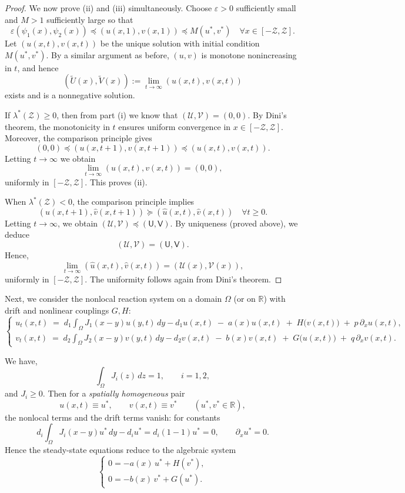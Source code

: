 \documentclass[a4paper,11pt]{amsart}
\theoremstyle{definition}
\numberwithin{equation}{section}
\theoremstyle{definition}
\begin{document}
\begin{proof}
\medskip

We now prove (ii) and (iii) simultaneously. Choose $\varepsilon > 0$ sufficiently small
and $M > 1$ sufficiently large so that
\[
\varepsilon (\psi_1(x), \psi_2(x)) \preceq (u(x,1), v(x,1)) \preceq M (u^{\ast}, v^{\ast})
\quad \forall x \in [-\mathcal{Z}, \mathcal{Z}].
\]
Let $(u(x,t), v(x,t))$ be the unique solution with initial condition $M(u^{\ast}, v^{\ast})$.
By a similar argument as before, $(u,v)$ is monotone nonincreasing in $t$, and hence
\[
(\widetilde{U}(x), \widetilde{V}(x)) := \lim_{t \to \infty} (u(x,t), v(x,t))
\]
exists and is a nonnegative solution.

If $\lambda^\ast(\mathcal{Z}) \geq 0$, then from part (i) we know that
$(\mathscr{U}, \mathscr{V}) = (0,0)$. By Dini’s theorem, the monotonicity in $t$ ensures uniform convergence in $x \in [-\mathcal{Z}, \mathcal{Z}]$. Moreover, the comparison principle gives
\[
(0,0) \preceq (u(x,t+1), v(x,t+1)) \preceq (u(x,t), v(x,t)).
\]
Letting $t \to \infty$ we obtain
\[
\lim_{t \to \infty} (u(x,t), v(x,t)) = (0,0),
\]
uniformly in $[-\mathcal{Z}, \mathcal{Z}]$. This proves (ii).

When $\lambda^\ast(\mathcal{Z}) < 0$, the comparison principle implies
\[
(\hat{u}(x,t+1), \hat{v}(x,t+1)) \succeq (\hat{u}(x,t), \hat{v}(x,t)) \quad \forall t \geq 0.
\]
Letting $t \to \infty$, we obtain $(\mathscr{U}, \mathscr{V}) \preceq (\mathsf{U}, \mathsf{V})$.
By uniqueness (proved above), we deduce
\[
(\mathscr{U}, \mathscr{V}) = (\mathsf{U}, \mathsf{V}).
\]
Hence,
\[
\lim_{t \to \infty} (\hat{u}(x,t), \hat{v}(x,t)) = (\mathscr{U}(x), \mathscr{V}(x)),
\]
uniformly in $[-\mathcal{Z}, \mathcal{Z}]$. The uniformity follows again from Dini’s theorem.
\end{proof}



Next, we consider the nonlocal reaction system on a domain $\Omega$ (or on $\mathbb R$)
with drift and nonlinear couplings $G,H$:
\[
\begin{cases}
u_t(x,t) \;=\; d_1\displaystyle\int_{\Omega} J_1(x-y)u(y,t)\,dy - d_1 u(x,t) \;-\; a(x)u(x,t) \;+\; H\big(v(x,t)\big) \;+\; p\,\partial_x u(x,t),\\[6pt]
v_t(x,t) \;=\; d_2\displaystyle\int_{\Omega} J_2(x-y)v(y,t)\,dy - d_2 v(x,t) \;-\; b(x)v(x,t) \;+\; G\big(u(x,t)\big) \;+\; q\,\partial_x v(x,t).
\end{cases}
\tag{S}
\]

We have,
\[
\displaystyle\int_{\Omega} J_i(z)\,dz = 1,\qquad i=1,2,
\]
and $J_i\geq0$. Then for a \emph{spatially homogeneous} pair
\[
u(x,t)\equiv u^\ast,\qquad v(x,t)\equiv v^\ast\qquad(u^\ast,v^\ast\in\mathbb R),
\]
the nonlocal terms and the drift terms vanish: for constants
\[
d_i\int_{\Omega} J_i(x-y)u^\ast\,dy - d_i u^\ast = d_i(1-1)u^\ast = 0,
\qquad \partial_x u^\ast = 0.
\]
Hence the steady-state equations reduce to the algebraic system
\[
\begin{cases}
0 = -a(x)\,u^\ast + H(v^\ast),\\[4pt]
0 = -b(x)\,v^\ast + G(u^\ast).
\end{cases}
\label{A}
\]
\end{document}
